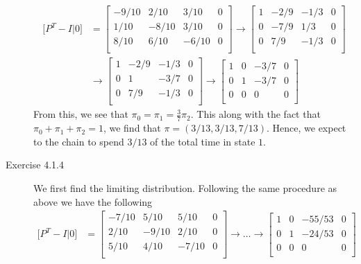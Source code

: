 \documentclass[12pt]{article}  %
\begin{document}
\begin{description}
\begin{align*}
\Big[P^T - I\Big\vert 0\Big] &= 
\begin{bmatrix}
-9/10 & 2/10 & 3/10 & 0\\
1/10 & -8/10 & 3/10 & 0\\
8/10 & 6/10 & -6/10 & 0\\
\end{bmatrix}
\rightarrow
\begin{bmatrix}
1 & -2/9 & -1/3 & 0\\
0 & -7/9 & 1/3 & 0\\
0 & 7/9 & -1/3 & 0\\
\end{bmatrix}\\
&\rightarrow \begin{bmatrix}
1 & -2/9 & -1/3 & 0\\
0 & 1 & -3/7 & 0\\
0 & 7/9 & -1/3 & 0\\
\end{bmatrix}
\rightarrow \begin{bmatrix}
1 & 0 & -3/7 & 0\\
0 & 1 & -3/7 & 0\\
0 & 0 & 0 & 0\\
\end{bmatrix}
\end{align*}
From this, we see that $\pi_0 = \pi_1 = \frac{3}{7}\pi_2$. This along with the fact that $\pi_0 + \pi_1 + \pi_2 = 1$, we find that $\pi = (3/13, 3/13, 7/13)$. Hence, we expect to the chain to spend $3/13$ of the total time in state $1$. 
\item[Exercise 4.1.4] We first find the limiting distribution. Following the same procedure as above we have the following 
\begin{align*}
\Big[P^T - I\Big\vert 0\Big] &= 
\begin{bmatrix}
-7/10 & 5/10 & 5/10 & 0\\
2/10 & -9/10 & 2/10 & 0\\
5/10 & 4/10 & -7/10 & 0\\
\end{bmatrix}
\rightarrow\dots\rightarrow
\begin{bmatrix}
1 & 0 & -55/53 & 0\\
0 & 1 & -24/53 & 0\\
0 & 0 & 0 & 0\\
\end{bmatrix}\\
\end{align*}

\end{description}
\end{document}
